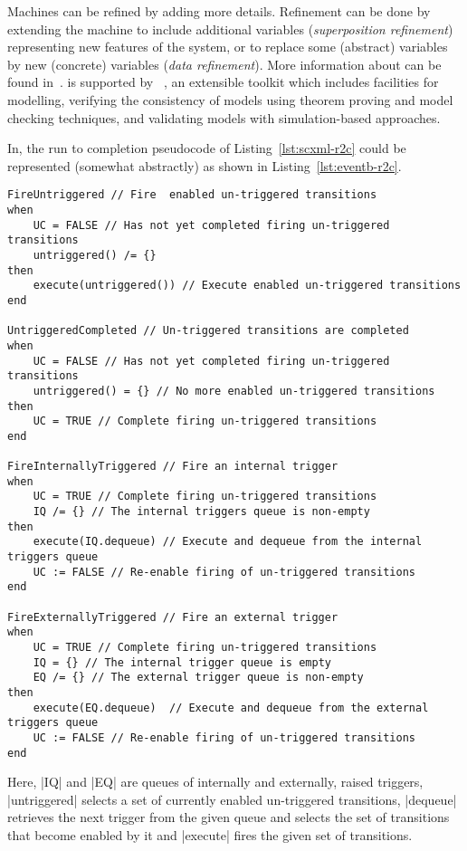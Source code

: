 Machines can be refined by adding more details.  Refinement can be done by extending the machine to include additional variables (\emph{superposition refinement}) representing new features of the system, or to replace some (abstract) variables by new (concrete) variables (\emph{data refinement}).  More information about \EventB can be found in~\cite{hoang13:_introd_event_b_model_method}.  \EventB is supported by \Rodin~\cite{abrial10:_rodin}, an extensible toolkit which includes facilities for modelling, verifying the consistency of models using theorem proving and model checking techniques, and validating models with simulation-based approaches.

In, \EventB the run to completion pseudocode of Listing~\ref{lst:scxml-r2c} could be represented (somewhat abstractly) as shown in Listing~\ref{lst:eventb-r2c}.
\begin{lstlisting}[caption={Run to completion pseudocode in \EventB},label={lst:eventb-r2c}, language=Event-B, escapechar=|, frame=single]
 FireUntriggered // Fire  enabled un-triggered transitions
when
    UC = FALSE // Has not yet completed firing un-triggered transitions
    untriggered() /= {}
then
    execute(untriggered()) // Execute enabled un-triggered transitions
end

UntriggeredCompleted // Un-triggered transitions are completed
when
    UC = FALSE // Has not yet completed firing un-triggered transitions
    untriggered() = {} // No more enabled un-triggered transitions
then
    UC = TRUE // Complete firing un-triggered transitions
end

FireInternallyTriggered // Fire an internal trigger
when
    UC = TRUE // Complete firing un-triggered transitions
    IQ /= {} // The internal triggers queue is non-empty
then
    execute(IQ.dequeue) // Execute and dequeue from the internal triggers queue
    UC := FALSE // Re-enable firing of un-triggered transitions
end

FireExternallyTriggered // Fire an external trigger
when
    UC = TRUE // Complete firing un-triggered transitions
    IQ = {} // The internal trigger queue is empty
    EQ /= {} // The external trigger queue is non-empty
then
    execute(EQ.dequeue)  // Execute and dequeue from the external triggers queue
    UC := FALSE // Re-enable firing of un-triggered transitions
end
\end{lstlisting}	
Here, |IQ| and |EQ| are queues of internally and externally, raised triggers, |untriggered| selects a set of currently enabled un-triggered transitions, |dequeue| retrieves the next trigger from the given queue and selects the set of transitions that become enabled by it and |execute| fires the given set of transitions. 
